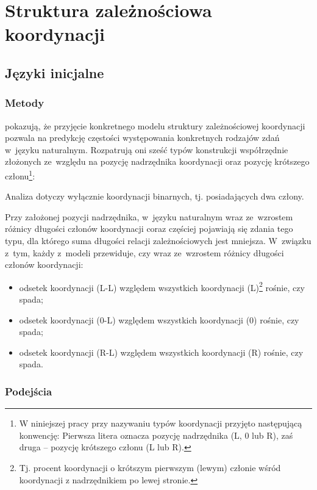 \chapter{Struktura zależnościowa koordynacji} \label{ch3}

\section{Języki inicjalne \citep{przepiorkowski2023conjunct}}

\subsection{Metody}

\cite{przepiorkowski2023conjunct} pokazują, że przyjęcie konkretnego modelu struktury zależnościowej koordynacji pozwala na predykcję częstości występowania konkretnych rodzajów zdań w~języku naturalnym. Rozpatrują oni sześć typów konstrukcji współrzędnie złożonych ze~względu na pozycję nadrzędnika koordynacji oraz pozycję krótszego członu\footnote{
W niniejszej pracy przy nazywaniu typów koordynacji przyjęto następującą konwencję: Pierwsza litera oznacza pozycję nadrzędnika (L, 0 lub R), zaś druga -- pozycję krótszego członu (L lub R).}:



Analiza dotyczy wyłącznie koordynacji binarnych, tj. posiadających dwa człony.

Przy założonej pozycji nadrzędnika, w~języku naturalnym wraz ze~wzrostem różnicy długości członów koordynacji coraz częściej pojawiają się zdania tego typu, dla którego suma długości relacji zależnościowych jest mniejsza. W~związku z~tym, każdy z~modeli przewiduje, czy wraz ze~wzrostem różnicy długości członów koordynacji:
\begin{itemize}
\item odsetek koordynacji (L-L) względem wszystkich koordynacji (L)\footnote{
Tj. procent koordynacji o krótszym pierwszym (lewym) członie wśród koordynacji z nadrzędnikiem po lewej stronie.}
rośnie, czy spada;
\item odsetek koordynacji (0-L) względem wszystkich koordynacji (0) rośnie, czy spada;
\item odsetek koordynacji (R-L) względem wszystkich koordynacji (R) rośnie, czy spada.
\end{itemize}

\subsection{Podejścia} \label{podejścia}

